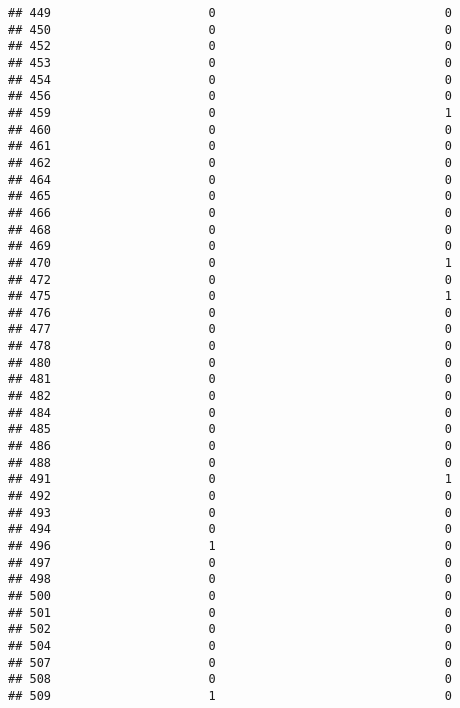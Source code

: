 \documentclass[
]{article}
\begin{document}
\begin{verbatim}
## 449                      0                                0
## 450                      0                                0
## 452                      0                                0
## 453                      0                                0
## 454                      0                                0
## 456                      0                                0
## 459                      0                                1
## 460                      0                                0
## 461                      0                                0
## 462                      0                                0
## 464                      0                                0
## 465                      0                                0
## 466                      0                                0
## 468                      0                                0
## 469                      0                                0
## 470                      0                                1
## 472                      0                                0
## 475                      0                                1
## 476                      0                                0
## 477                      0                                0
## 478                      0                                0
## 480                      0                                0
## 481                      0                                0
## 482                      0                                0
## 484                      0                                0
## 485                      0                                0
## 486                      0                                0
## 488                      0                                0
## 491                      0                                1
## 492                      0                                0
## 493                      0                                0
## 494                      0                                0
## 496                      1                                0
## 497                      0                                0
## 498                      0                                0
## 500                      0                                0
## 501                      0                                0
## 502                      0                                0
## 504                      0                                0
## 507                      0                                0
## 508                      0                                0
## 509                      1                                0

\end{verbatim}
\end{document}
